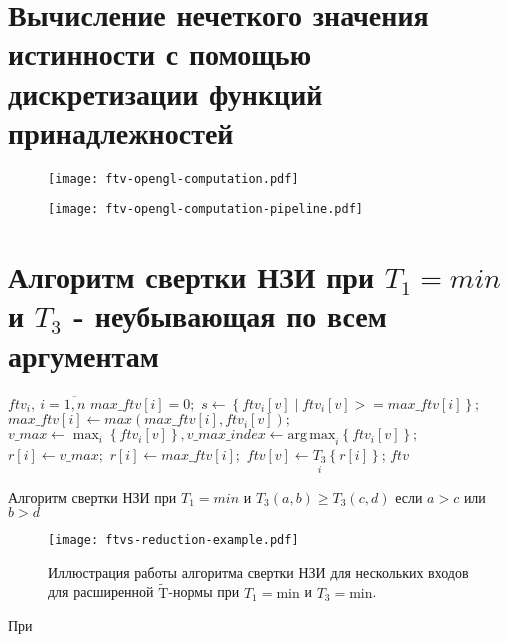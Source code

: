 \section{Вычисление нечеткого значения истинности с помощью дискретизации функций принадлежностей}\label{sec:ch3/sect1}

\begin{figure}[hbt]
	\centering
   	\texttt{[image: ftv-opengl-computation.pdf]}
	\label{ftv-opengl-computation}
\end{figure}

\begin{figure}[hbt]
	\centering
   	\texttt{[image: ftv-opengl-computation-pipeline.pdf]}
	\label{ftv-opengl-computation-pipeline}
\end{figure}

\section{Алгоритм свертки НЗИ при $T_1=min$ и $T_3$ - неубывающая по всем аргументам}\label{sec:ch3/sect2}

\begin{algorithm}
\label{alg:ftv-reduction}
\begin{algorithmic}
\Require $ftv_i,\ i=\overline{1,n}$
\State $max\_ftv[i] = 0;$
\State $s \gets \left\{ftv_i[v] \mid ftv_i[v] >= max\_ftv[i]\right\};$
\State $max\_ftv[i] \gets max(max\_ftv[i], ftv_i[v]);$
\State $v\_max \gets \max_{i}\left\{ftv_i[v]\right\}, v\_max\_index \gets \mathrm{arg\,max}_i\left\{ftv_i[v]\right\};$
\State $r[i] \gets v\_max;$
\Else
\State $r[i] \gets max\_ftv[i];$
\EndIf
\State $ftv[v] \gets \underset{i}{T_3}\left\{r[i]\right\}$;
\EndFor
\State \Return $ftv$
\end{algorithmic}
\caption{Алгоритм свертки НЗИ при $T_1=min$ и $T_3(a, b) \ge T_3(c, d)$ если $a > c$ или $b > d$}
\end{algorithm}

\begin{figure}
    \label{fig:ftvs-reduction-example}
    \centering
    \texttt{[image: ftvs-reduction-example.pdf]}
    \caption{Иллюстрация работы алгоритма свертки НЗИ для нескольких входов для расширенной $\mathrm{\tilde{T}}$-нормы при $T_1=\mathrm{min}$ и $T_3=\mathrm{min}$.}
\end{figure}

При 


